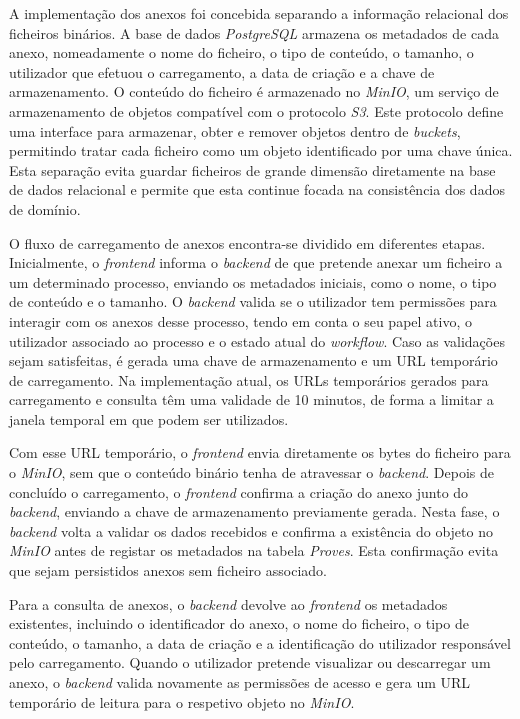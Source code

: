 A implementação dos anexos foi concebida separando a informação relacional dos ficheiros binários. A base de dados \textit{PostgreSQL} armazena os metadados de cada anexo, nomeadamente o nome do ficheiro, o tipo de conteúdo, o tamanho, o utilizador que efetuou o carregamento, a data de criação e a chave de armazenamento. O conteúdo do ficheiro é armazenado no \textit{MinIO}\cite{minio-storage}, um serviço de armazenamento de objetos compatível com o protocolo \textit{S3}\cite{amazon-s3}. Este protocolo define uma interface para armazenar, obter e remover objetos dentro de \textit{buckets}, permitindo tratar cada ficheiro como um objeto identificado por uma chave única. Esta separação evita guardar ficheiros de grande dimensão diretamente na base de dados relacional e permite que esta continue focada na consistência dos dados de domínio.

O fluxo de carregamento de anexos encontra-se dividido em diferentes etapas. Inicialmente, o \textit{frontend} informa o \textit{backend} de que pretende anexar um ficheiro a um determinado processo, enviando os metadados iniciais, como o nome, o tipo de conteúdo e o tamanho. O \textit{backend} valida se o utilizador tem permissões para interagir com os anexos desse processo, tendo em conta o seu papel ativo, o utilizador associado ao processo e o estado atual do \textit{workflow}. Caso as validações sejam satisfeitas, é gerada uma chave de armazenamento e um URL temporário de carregamento. Na implementação atual, os URLs temporários gerados para carregamento e consulta têm uma validade de 10 minutos, de forma a limitar a janela temporal em que podem ser utilizados.

Com esse URL temporário, o \textit{frontend} envia diretamente os bytes do ficheiro para o \textit{MinIO}, sem que o conteúdo binário tenha de atravessar o \textit{backend}. Depois de concluído o carregamento, o \textit{frontend} confirma a criação do anexo junto do \textit{backend}, enviando a chave de armazenamento previamente gerada. Nesta fase, o \textit{backend} volta a validar os dados recebidos e confirma a existência do objeto no \textit{MinIO} antes de registar os metadados na tabela \textit{Proves}. Esta confirmação evita que sejam persistidos anexos sem ficheiro associado.

Para a consulta de anexos, o \textit{backend} devolve ao \textit{frontend} os metadados existentes, incluindo o identificador do anexo, o nome do ficheiro, o tipo de conteúdo, o tamanho, a data de criação e a identificação do utilizador responsável pelo carregamento. Quando o utilizador pretende visualizar ou descarregar um anexo, o \textit{backend} valida novamente as permissões de acesso e gera um URL temporário de leitura para o respetivo objeto no \textit{MinIO}.

